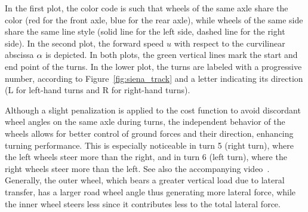 In the first plot, the color code is such that wheels of the same axle share the color (red for the front axle, blue for the rear axle), while wheels of the same side share the same line style (solid line for the left side, dashed line for the right side). In the second plot, the forward speed $u$ with respect to the curvilinear abscissa $\alpha$ is depicted.
In both plots, the green vertical lines mark the start and end point of the turns. In the lower plot, the turns are labeled with a progressive number, according to Figure~\ref{fig:siena_track} and a letter indicating its direction (L for left-hand turns and R for right-hand turns).

Although a slight penalization is applied to the cost function to avoid discordant wheel angles on the same axle during turns, the independent behavior of the wheels allows for better control of ground forces and their direction, enhancing turning performance. This is especially noticeable in turn 5 (right turn), where the left wheels steer more than the right, and in turn 6 (left turn), where the right wheels steer more than the left. See also the accompanying video~\cite{video:RWDAS:2024}. Generally, the outer wheel, which bears a greater vertical load due to lateral transfer, has a larger road wheel angle thus generating more lateral force, while the inner wheel steers less since it contributes less to the total lateral force.
